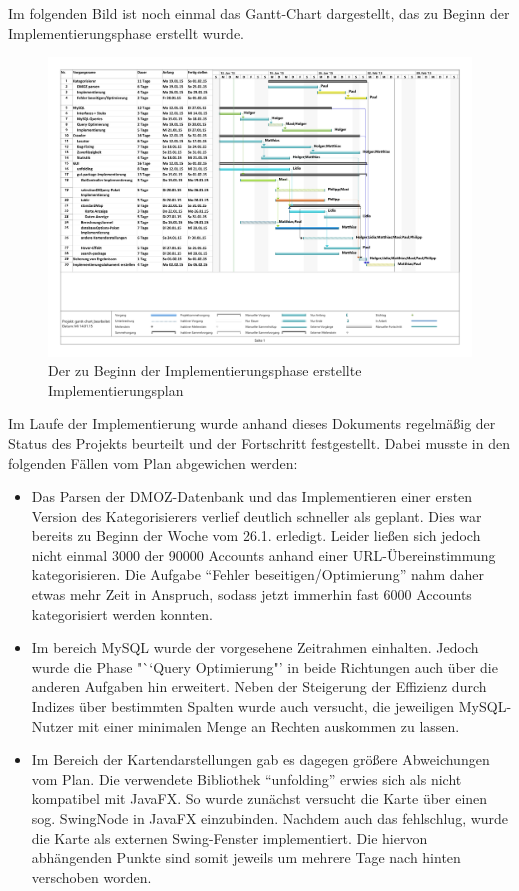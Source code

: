 Im folgenden Bild ist noch einmal das Gantt-Chart dargestellt, das zu Beginn der Implementierungsphase erstellt wurde.

\begin{figure}[H]
	\centering
	\includegraphics[width=\textwidth]{../Gantt/Implementierungsplan.pdf}
	\caption{Der zu Beginn der Implementierungsphase erstellte Implementierungsplan}
\end{figure}

Im Laufe der Implementierung wurde anhand dieses Dokuments regelmäßig der Status des Projekts beurteilt und der Fortschritt festgestellt. Dabei musste in den folgenden Fällen vom Plan abgewichen werden:
\begin{itemize}
	\item Das Parsen der DMOZ-Datenbank und das Implementieren einer ersten Version des Kategorisierers verlief deutlich schneller als geplant. Dies war bereits zu Beginn der Woche vom 26.1. erledigt. Leider ließen sich jedoch nicht einmal 3000 der 90000 Accounts anhand einer URL-Übereinstimmung kategorisieren. Die Aufgabe "`Fehler beseitigen/Optimierung"' nahm daher etwas mehr Zeit in Anspruch, sodass jetzt immerhin fast 6000 Accounts kategorisiert werden konnten.
	\item Im bereich MySQL wurde der vorgesehene Zeitrahmen einhalten. Jedoch wurde die Phase "``Query Optimierung"' in beide Richtungen auch über die anderen Aufgaben hin erweitert. Neben der Steigerung der Effizienz durch Indizes über bestimmten Spalten wurde auch versucht, die jeweiligen MySQL-Nutzer mit einer minimalen Menge an Rechten auskommen zu lassen.
	\item Im Bereich der Kartendarstellungen gab es dagegen größere Abweichungen vom Plan. Die verwendete Bibliothek "`unfolding"' erwies sich als nicht kompatibel mit JavaFX. So wurde zunächst versucht die Karte über einen sog. SwingNode in JavaFX einzubinden. Nachdem auch das fehlschlug, wurde die Karte als externen Swing-Fenster implementiert. Die hiervon abhängenden Punkte sind somit jeweils um mehrere Tage nach hinten verschoben worden.
\end{itemize}